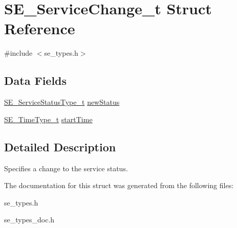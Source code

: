 \hypertarget{structSE__ServiceChange__t}{}\section{S\+E\+\_\+\+Service\+Change\+\_\+t Struct Reference}
\label{structSE__ServiceChange__t}


{\ttfamily \#include $<$se\+\_\+types.\+h$>$}

\subsection*{Data Fields}
\begin{DoxyCompactItemize}
\item 
\hyperlink{group__ServiceStatusType_gaa3cd725afc87388d65acf81254caee7d}{S\+E\+\_\+\+Service\+Status\+Type\+\_\+t} \hyperlink{group__ServiceChange_ga6fc30f7a71370dcc2caad34630b3404e}{new\+Status}
\item 
\hyperlink{group__TimeType_ga6fba87a5b57829b4ff3f0e7638156682}{S\+E\+\_\+\+Time\+Type\+\_\+t} \hyperlink{group__ServiceChange_gad007f73cce823a5322de7f46935a4bfe}{start\+Time}
\end{DoxyCompactItemize}


\subsection{Detailed Description}
Specifies a change to the service status. 

The documentation for this struct was generated from the following files\+:\begin{DoxyCompactItemize}
\item 
se\+\_\+types.\+h\item 
se\+\_\+types\+\_\+doc.\+h\end{DoxyCompactItemize}
